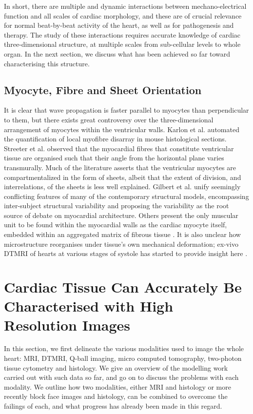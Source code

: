   In short, there are multiple and dynamic interactions between mechano-electrical function and all scales of cardiac morphology, and these are of crucial relevance for normal beat-by-beat activity of the heart, as well as for pathogenesis and therapy. The study of these interactions requires accurate knowledge of cardiac three-dimensional structure, at multiple scales from sub-cellular levels to whole organ. In the next section, we discuss what has been achieved so far toward characterising this structure.
  
  \subsection{Myocyte, Fibre and Sheet Orientation} %
  \label{sub:fibre_direction}
    It is clear that wave propagation is faster parallel to myocytes than perpendicular to them, but there exists great controversy over the three-dimensional arrangement of myocytes within the ventricular walls. Karlon et al. \cite{Karlon1998} automated the quantification of local myofibre disarray in mouse histological sections. Streeter et al. \cite{StreeterJr1969} observed that the myocardial fibres that constitute ventricular tissue are organised such that their angle from the horizontal plane varies transmurally. Much of the literature asserts that the ventricular myocytes are compartmentalized in the form of sheets, albeit that the extent of division, and interrelations, of the sheets is less well explained. Gilbert et al. \cite{Gilbert2007} unify seemingly conflicting features of many of the contemporary structural models, encompassing inter-subject structural variability and proposing the variability as the root source of debate on myocardial architecture. Others present the only muscular unit to be found within the myocardial walls as the cardiac myocyte itself, embedded within an aggregated matrix of fibrous tissue \cite{Anderson2009}. It is also unclear how microstructure reorganises under tissue's own mechanical deformation; ex-vivo DTMRI of hearts at various stages of systole has started to provide insight here \cite{Hales2012}.
  
\section{Cardiac Tissue Can Accurately Be Characterised with High Resolution Images} %
\label{sec:cardiac_tissue_can_be_accurately_characterised_with_high_resolution_data}
  In this section, we first delineate the various modalities used to image the whole heart: MRI, DTMRI, Q-ball imaging, micro computed tomography, two-photon tissue cytometry and histology. We give an overview of the modelling work carried out with such data so far, and go on to discuss the problems with each modality. We outline how two modalities, either MRI and histology or more recently block face images and histology, can be combined to overcome the failings of each, and what progress has already been made in this regard.
  
